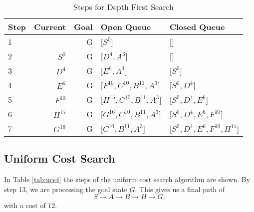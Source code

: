 \documentclass{article}
\begin{document}
    \begin{table}[!htp]\centering
        \caption{Steps for Depth First Search}\label{tab:dfs4}
        \scriptsize
        \begin{tabular}{lrrll}\toprule
        Step &Current&Goal& Open Queue &Closed Queue  \\\midrule
        1&  &G &[$S^0$] &[] \\
        2& $S^0$ &G &[$D^4, A^3$] &[] \\
        3& $D^4$ &G &[$E^6, A^3$] &[$S^0$] \\
        4& $E^6$ &G &[$F^{10}, C^{10}, B^{11}, A^3$] &[$S^0, D^4$] \\
        5& $F^{10}$ &G &[$H^{15},C^{10}, B^{11}, A^3$] &[$S^0, D^4, E^{6}$] \\
        6& $H^{15}$ &G &[$G^{16},C^{10}, B^{11}, A^3$] &[$S^0, D^4, E^{6}, F^{10}$] \\
        7& $G^{16}$ &G &[$C^{10}, B^{11}, A^3$] &[$S^0, D^4, E^{6}, F^{10}, H^{15}$] \\

        \end{tabular}
    \end{table}




\subsection{Uniform Cost Search}

    In Table \ref{tab:ucs4} the steps of the uniform cost search algorithm are shown. 
    By step 13, we are processing the goal state $G$. This gives us a final path of
    \begin{equation}
        S \rightarrow A \rightarrow B \rightarrow H \rightarrow G,
    \end{equation}
    with a cost of $12$.
\end{document}
